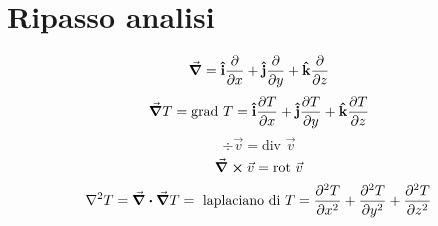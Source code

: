\section{Ripasso analisi}
\[ \grad = \vu{i} \pdv{x} + \vu{j} \pdv{y} + \vu{k} \pdv{z} \]
\[ \grad{T} = \text{grad } T = \vu{i} \pdv{T}{x} + \vu{j} \pdv{T}{y} + \vu{k} \pdv{T}{z} \]
\[ \div{\vec{v}} = \text{div }\vec{v} \]
\[ \curl{\vec{v}} = \text{rot }\vec{v} \]
\[ \laplacian{T} = \div{\grad{T}} = \text{ laplaciano di } T = \pdv[2]{T}{x} + \pdv[2]{T}{y} + \pdv[2]{T}{z} \]

